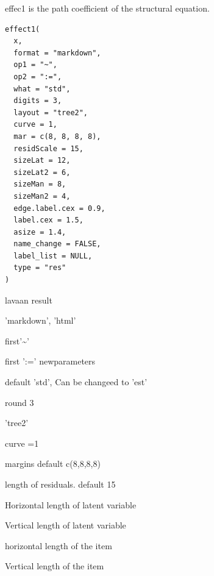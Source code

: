 \documentclass[a4paper]{book}
\begin{document}
%
\begin{Description}
effec1 is the path coefficient of the structural equation.
\end{Description}
%
\begin{Usage}
\begin{verbatim}
effect1(
  x,
  format = "markdown",
  op1 = "~",
  op2 = ":=",
  what = "std",
  digits = 3,
  layout = "tree2",
  curve = 1,
  mar = c(8, 8, 8, 8),
  residScale = 15,
  sizeLat = 12,
  sizeLat2 = 6,
  sizeMan = 8,
  sizeMan2 = 4,
  edge.label.cex = 0.9,
  label.cex = 1.5,
  asize = 1.4,
  name_change = FALSE,
  label_list = NULL,
  type = "res"
)
\end{verbatim}
\end{Usage}
%
\begin{Arguments}
\begin{ldescription}
\item[\code{x}] lavaan result

\item[\code{format}] 'markdown', 'html'

\item[\code{op1}] first'\textasciitilde{}'

\item[\code{op2}] first ':='  newparameters

\item[\code{what}] default 'std', Can be changeed to 'est'

\item[\code{digits}] round 3

\item[\code{layout}] 'tree2'

\item[\code{curve}] curve =1

\item[\code{mar}] margins default c(8,8,8,8)

\item[\code{residScale}] length of residuals. default 15

\item[\code{sizeLat}] Horizontal length of latent variable

\item[\code{sizeLat2}] Vertical length of latent variable

\item[\code{sizeMan}] horizontal length of the item

\item[\code{sizeMan2}] Vertical length of the item


\end{ldescription}
\end{Arguments}
\end{document}

